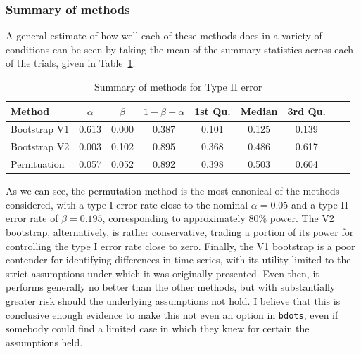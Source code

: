 \documentclass{article}
\newcommand{\xt}{\texttt}
\begin{document}
\subsubsection{Summary of methods}

A general estimate of how well each of these methods does in a variety of conditions can be seen by taking the mean of the summary statistics across each of the trials, given in Table~\ref{tab:type_2_summary}.

\begin{table}[H]
\centering
\begin{tabular}{lcccccccc}
  \hline
Method & $\alpha$ & $\beta$ & $1 - \beta - \alpha$  & 1st Qu. & Median & 3rd Qu.  \\ 
  \hline
Bootstrap V1 & 0.613 & 0.000 & 0.387 & 0.101 & 0.125 & 0.139 \\ 
  Bootstrap V2 & 0.003 & 0.102 & 0.895 & 0.368 & 0.486 & 0.617 \\ 
  Permtuation & 0.057 & 0.052 & 0.892 & 0.398 & 0.503 & 0.604 \\ 
   \hline
\end{tabular}
\caption{Summary of methods for Type II error} 
\label{tab:type_2_summary}
\end{table}

As we can see, the permutation method is the most canonical of the methods considered, with a type I error rate close to the nominal $\alpha = 0.05$ and a type II error rate of $\beta = 0.195$, corresponding to approximately 80\% power. The V2 bootstrap, alternatively, is rather conservative, trading a portion of its power for controlling the type I error rate close to zero. Finally, the V1 bootstrap is a poor contender for identifying differences in time series, with its utility limited to the strict assumptions under which it was originally presented. Even then, it performs generally no better than the other methods, but with substantially greater risk should the underlying assumptions not hold. I believe that this is conclusive enough evidence to make this not even an option in \xt{bdots}, even if somebody could find a limited case in which they knew for certain the assumptions held. 
\end{document}
